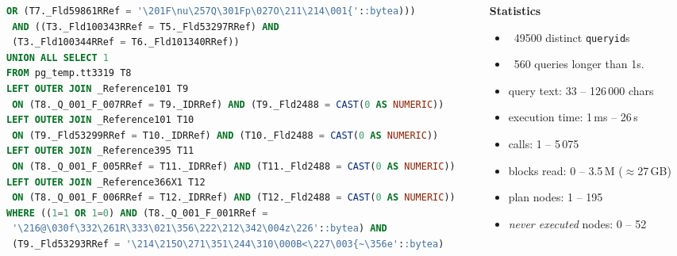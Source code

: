 \documentclass{beamer}
\begin{document}
\begin{frame}[fragile]
\begin{columns}[T]
\begin{column}{0.55\textwidth}
\begin{tcolorbox}[enhanced, sharp corners=downhill, arc=1pt,
  colback=paper, colframe=mailrule, boxrule=0.4pt,
  left=3pt, right=3pt, top=3pt, bottom=2pt,
  before skip=0pt, after skip=2pt]
\begin{lstlisting}[language=SQL, breaklines=true, columns=fixed,
  basicstyle=\ttfamily\fontsize{3.1}{3.5}\selectfont,
  keywordstyle=\ttfamily]
 OR (T7._Fld59861RRef = '\201F\nu\257Q\301Fp\027O\211\214\001{'::bytea)))
 AND ((T3._Fld100343RRef = T5._Fld53297RRef) AND
 (T3._Fld100344RRef = T6._Fld101340RRef))
UNION ALL SELECT 1
FROM pg_temp.tt3319 T8
LEFT OUTER JOIN _Reference101 T9
 ON (T8._Q_001_F_007RRef = T9._IDRRef) AND (T9._Fld2488 = CAST(0 AS NUMERIC))
LEFT OUTER JOIN _Reference101 T10
 ON (T9._Fld53299RRef = T10._IDRRef) AND (T10._Fld2488 = CAST(0 AS NUMERIC))
LEFT OUTER JOIN _Reference395 T11
 ON (T8._Q_001_F_005RRef = T11._IDRRef) AND (T11._Fld2488 = CAST(0 AS NUMERIC))
LEFT OUTER JOIN _Reference366X1 T12
 ON (T8._Q_001_F_006RRef = T12._IDRRef) AND (T12._Fld2488 = CAST(0 AS NUMERIC))
WHERE ((1=1 OR 1=0) AND (T8._Q_001_F_001RRef =
 '\216@\030f\332\261R\333\021\356\222\212\342\004z\226'::bytea) AND
 (T9._Fld53293RRef = '\214\215O\271\351\244\310\000B<\227\003{~\356e'::bytea)
\end{lstlisting}
\end{tcolorbox}
\end{column}

\begin{column}{0.45\textwidth}
\begin{center}
	{\scriptsize\textbf{Statistics}}
\end{center}
\par\vspace{2pt}
{\scriptsize
\begin{itemize}\itemsep2pt
 \item ~49500 distinct \texttt{queryid}s
 \item ~560 queries longer than 1s.
 \item query text: 33 -- 126\,000 chars
 \item execution time: 1\,ms -- 26\,s
 \item calls: 1 -- 5\,075
 \item blocks read: 0 -- 3.5\,M ($\approx$27\,GB)
 \item plan nodes: 1 -- 195
 \item \emph{never executed} nodes: 0 -- 52
\end{itemize}
}
\end{column}

\end{columns}
\end{frame}


\end{document}
